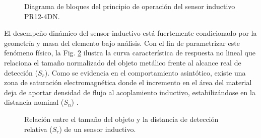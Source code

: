 \documentclass[conference]{IEEEtran}
\begin{document}
\begin{figure}[htbp]
    \centering
    \caption{Diagrama de bloques del principio de operación del sensor inductivo PR12-4DN.}
    \label{fig:bloques_inductivo}
\end{figure}

El desempeño dinámico del sensor inductivo está fuertemente condicionado por la geometría y masa del elemento bajo análisis. Con el fin de parametrizar este fenómeno físico, la Fig. \ref{fig:respuesta_inductivo} ilustra la curva característica de respuesta no lineal que relaciona el tamaño normalizado del objeto metálico frente al alcance real de detección ($S_r$). Como se evidencia en el comportamiento asintótico, existe una zona de saturación electromagnética donde el incremento en el área del material deja de aportar densidad de flujo al acoplamiento inductivo, estabilizándose en la distancia nominal ($S_n$) \cite{sensores_8}.

\begin{figure}[htbp]
    \centering
    \caption{Relación entre el tamaño del objeto y la distancia de detección relativa ($S_r$) de un sensor inductivo.}
    \label{fig:respuesta_inductivo}
\end{figure}
\end{document}
